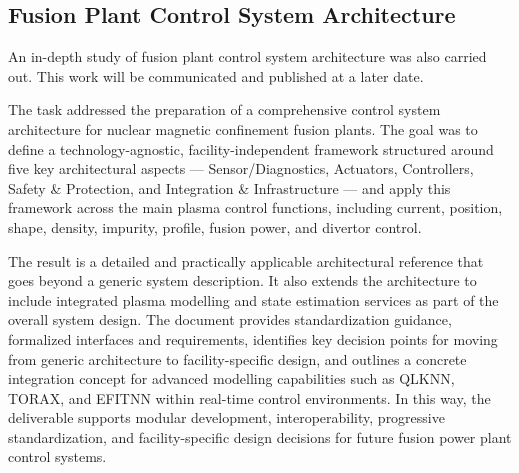 \documentclass[preprint]{elsarticle}
\begin{document}
%
%
%



\subsection{Fusion Plant Control System Architecture} 

An in-depth study of fusion plant control system architecture was also carried out.  
This work will be communicated and published at a later date. 

The task addressed the preparation of a comprehensive control system architecture for nuclear magnetic confinement fusion plants. The goal was to define a technology-agnostic, facility-independent framework structured around five key architectural aspects — Sensor/Diagnostics, Actuators, Controllers, Safety & Protection, and Integration & Infrastructure — and apply this framework across the main plasma control functions, including current, position, shape, density, impurity, profile, fusion power, and divertor control.

The result is a detailed and practically applicable architectural reference that goes beyond a generic system description. It also extends the architecture to include integrated plasma modelling and state estimation services as part of the overall system design. The document provides standardization guidance, formalized interfaces and requirements, identifies key decision points for moving from generic architecture to facility-specific design, and outlines a concrete integration concept for advanced modelling capabilities such as QLKNN, TORAX, and EFITNN within real-time control environments. In this way, the deliverable supports modular development, interoperability, progressive standardization, and facility-specific design decisions for future fusion power plant control systems.

\end{document}
